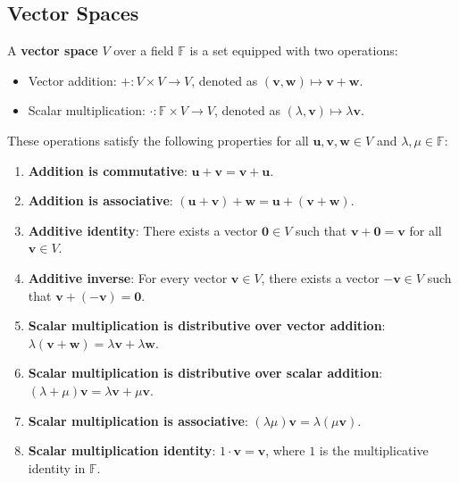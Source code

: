 \subsection{Vector Spaces}

A \textbf{vector space} $V$ over a field $\mathbb{F}$ is a set equipped with two operations:

\begin{itemize}
    \item Vector addition: $+: V \times V \rightarrow V$, denoted as $(\mathbf{v}, \mathbf{w}) \mapsto \mathbf{v} + \mathbf{w}$.
    \item Scalar multiplication: $\cdot: \mathbb{F} \times V \rightarrow V$, denoted as $(\lambda, \mathbf{v}) \mapsto \lambda \mathbf{v}$.
\end{itemize}

These operations satisfy the following properties for all $\mathbf{u}, \mathbf{v}, \mathbf{w} \in V$ and $\lambda, \mu \in \mathbb{F}$:

\begin{enumerate}
    \item \textbf{Addition is commutative}: $\mathbf{u} + \mathbf{v} = \mathbf{v} + \mathbf{u}$.
    \item \textbf{Addition is associative}: $(\mathbf{u} + \mathbf{v}) + \mathbf{w} = \mathbf{u} + (\mathbf{v} + \mathbf{w})$.
    \item \textbf{Additive identity}: There exists a vector $\mathbf{0} \in V$ such that $\mathbf{v} + \mathbf{0} = \mathbf{v}$ for all $\mathbf{v} \in V$.
    \item \textbf{Additive inverse}: For every vector $\mathbf{v} \in V$, there exists a vector $-\mathbf{v} \in V$ such that $\mathbf{v} + (-\mathbf{v}) = \mathbf{0}$.
    \item \textbf{Scalar multiplication is distributive over vector addition}: $\lambda (\mathbf{v} + \mathbf{w}) = \lambda \mathbf{v} + \lambda \mathbf{w}$.
    \item \textbf{Scalar multiplication is distributive over scalar addition}: $(\lambda + \mu) \mathbf{v} = \lambda \mathbf{v} + \mu \mathbf{v}$.
    \item \textbf{Scalar multiplication is associative}: $(\lambda \mu) \mathbf{v} = \lambda (\mu \mathbf{v})$.
    \item \textbf{Scalar multiplication identity}: $1 \cdot \mathbf{v} = \mathbf{v}$, where $1$ is the multiplicative identity in $\mathbb{F}$.
\end{enumerate}